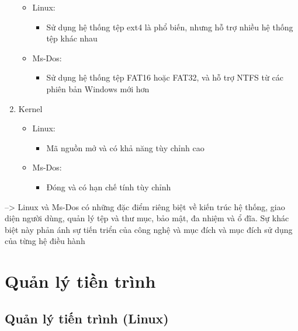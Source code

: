 \documentclass[12pt,a4paper]{article}
\begin{document}
\begin{enumerate}
	\begin{itemize}
		\item Linux:
		\begin{itemize}
			\item Sử dụng hệ thống tệp ext4 là phổ biến, nhưng hỗ trợ nhiều hệ thống tệp khác nhau
		\end{itemize}
		\item Ms-Dos:
		\begin{itemize}
			\item Sử dụng hệ thống tệp FAT16 hoặc FAT32, và hỗ trợ NTFS từ các phiên bản Windows mới hơn
		\end{itemize} 
	\end{itemize}
	\item Kernel
	\begin{itemize}
		\item Linux:
		\begin{itemize}
			\item Mã nguồn mở và có khả năng tùy chỉnh cao
		\end{itemize}
		\item Ms-Dos:
		\begin{itemize}
			\item Đóng và có hạn chế tính tùy chỉnh 
		\end{itemize} 
	\end{itemize}
\end{enumerate}
--> Linux và Ms-Dos có những đặc điểm riêng biệt về kiến trúc hệ thống, giao diện người dùng, quản lý tệp và thư mục, bảo mật, đa nhiệm và ổ đĩa. Sự khác biệt này phản ánh sự tiến triển của công nghệ và mục đích và mục đích sử dụng của từng hệ điều hành

\section{Quản lý tiền trình}

\subsection{Quản lý tiến trình (Linux)}
\end{document}
